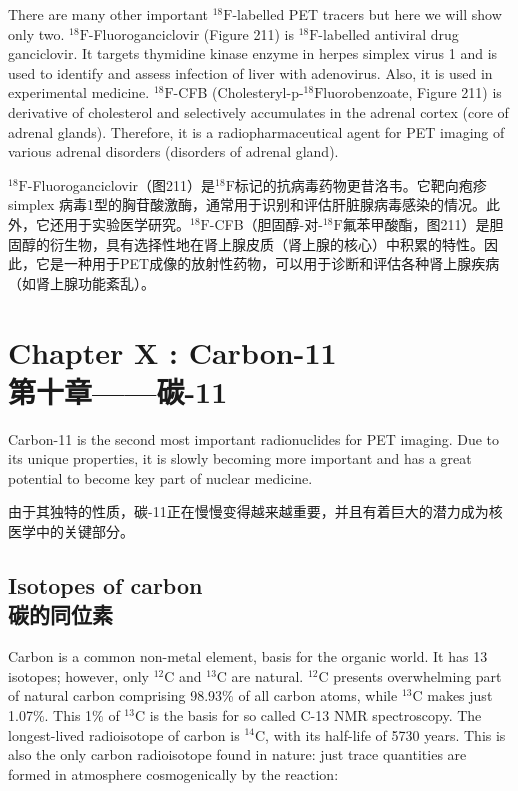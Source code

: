 \documentclass[dvipsnames, svgnames,a4paper,11pt]{article}
\begin{document}
There are many other important ${}^\mathrm{18}\mathrm{F}$-labelled PET tracers but here we will show only
two. ${}^\mathrm{18}\mathrm{F}$-Fluoroganciclovir (Figure 211) is ${}^\mathrm{18}\mathrm{F}$-labelled antiviral drug ganciclovir. It
targets thymidine kinase enzyme in herpes simplex virus 1 and is used to identify
and assess infection of liver with adenovirus. Also, it is used in experimental
medicine. ${}^\mathrm{18}\mathrm{F}$-CFB (Cholesteryl-p-${}^\mathrm{18}\mathrm{F}$luorobenzoate, Figure 211) is derivative of
cholesterol and selectively accumulates in the adrenal cortex (core of adrenal
glands). Therefore, it is a radiopharmaceutical agent for PET imaging of various
adrenal disorders (disorders of adrenal gland).


${}^\mathrm{18}\mathrm{F}$-Fluoroganciclovir（图211）是${}^\mathrm{18}\mathrm{F}$标记的抗病毒药物更昔洛韦。它靶向疱疹 simplex 病毒1型的胸苷酸激酶，通常用于识别和评估肝脏腺病毒感染的情况。此外，它还用于实验医学研究。${}^\mathrm{18}\mathrm{F}$-CFB（胆固醇-对-${}^\mathrm{18}\mathrm{F}$氟苯甲酸酯，图211）是胆固醇的衍生物，具有选择性地在肾上腺皮质（肾上腺的核心）中积累的特性。因此，它是一种用于PET成像的放射性药物，可以用于诊断和评估各种肾上腺疾病（如肾上腺功能紊乱）。

\newpage

\section{Chapter X :  Carbon-11 \\第十章——碳-11}

Carbon-11 is the second most important radionuclides for PET imaging. Due to its
unique properties, it is slowly becoming more important and has a great potential to
become key part of nuclear medicine.

由于其独特的性质，碳-11正在慢慢变得越来越重要，并且有着巨大的潜力成为核医学中的关键部分。

\subsection{Isotopes of carbon \\碳的同位素}
Carbon is a common non-metal element, basis for the organic world. It has 13
isotopes; however, only ${}^\mathrm{12}\mathrm{C}$ and ${}^\mathrm{13}\mathrm{C}$ are natural. ${}^\mathrm{12}\mathrm{C}$ presents overwhelming part of
natural carbon comprising 98.93\% of all carbon atoms, while ${}^\mathrm{13}\mathrm{C}$ makes just 1.07\%.
This 1\% of ${}^\mathrm{13}\mathrm{C}$ is the basis for so called C-13 NMR spectroscopy. The longest-lived
radioisotope of carbon is ${}^\mathrm{14}\mathrm{C}$, with its half-life of 5730 years. This is also the only
carbon radioisotope found in nature: just trace quantities are formed in atmosphere
cosmogenically by the reaction:
\end{document}
